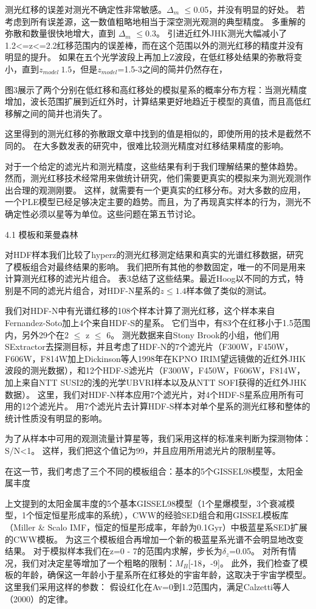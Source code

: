 \documentclass[8pt,a4paper,openany,twoside]{book}
\begin{document}
测光红移的误差对测光不确定性非常敏感。$\Delta_m$ $\leq$0.05，并没有明显的好处。
若考虑到所有误差源，这一数值粗略地相当于深空测光观测的典型精度。
多重解的弥散和数量很快地增大，直到 $\Delta_m$ $\leq$0.3。
引进近红外JHK测光大幅减小了1.2<=z<=2.2红移范围内的误差棒，而在这个范围以外的测光红移的精度并没有明显的提升。
如果在五个光学波段上再加上Z波段，在低红移处结果的弥散将变小，直到$z_{model}~1.5$，但是$z_{model}$=1.5-3之间的简并仍然存在，
 
图3展示了两个分别在低红移和高红移处的模拟星系的概率分布方程：当测光精度增加，波长范围扩展到近红外时，计算结果更好地趋近于模型的真值，而且高低红移解之间的简并也消失了。
 
这里得到的测光红移的弥散跟文章中找到的值是相似的，即使所用的技术是截然不同的。
在大多数发表的研究中，很难比较测光精度对红移结果精度的影响。
 
对于一个给定的滤光片和测光精度，这些结果有利于我们理解结果的整体趋势。
然而，测光红移技术经常用来做统计研究，他们需要更真实的模拟来为测光观测作出合理的观测刚要。
这样，就需要有一个更真实的红移分布。对大多数的应用，一个PLE模型已经足够决定主要的趋势。而且，为了再现真实样本的行为，测光不确定性必须以星等为单位。这些问题在第五节讨论。
 
4.1 模板和莱曼森林
 
对HDF样本我们比较了hyperz的测光红移测定结果和真实的光谱红移数据，研究了模板组合对最终结果的影响。
我们把所有其他的参数固定，唯一的不同是用来计算测光红移的滤光片组合。
表3总结了这些结果。最近Hoog以不同的方式，特别是不同的滤光片组合，对HDF-N星系的$z\leq1.4$样本做了类似的测试。
 
我们对HDF-N中有光谱红移的108个样本计算了测光红移，这个样本来自Fernandez-Soto加上4个来自HDF-S的星系。
它们当中，有83个在红移小于1.5范围内，另外29个在2 $\le$ z $\le$ 6。
测光数据来自Stony Brook的小组，他们用SExtractor去探测目标，并且考虑了HDF-N的7个滤光片（F300W，F450W，F606W，F814W加上Dickinson等人1998年在KPNO IRIM望远镜做的近红外JHK波段的测光数据），和12个HDF-S滤光片（F300W，F450W，F606W，F814W，加上来自NTT SUSI2的浅的光学UBVRI样本以及从NTT SOFI获得的近红外JHK数据）。
这里，我们对HDF-N样本应用7个滤光片，对4个HDF-S星系应用所有可用的12个滤光片。
用7个滤光片去计算HDF-S样本对单个星系的测光红移和整体的统计性质没有明显的影响。
 
为了从样本中可用的观测流量计算星等，我们采用这样的标准来判断为探测物体：S/N<1。
这样，我们把这个值记为99，并且应用所用滤光片的限制星等。
 
在这一节，我们考虑了三个不同的模板组合：基本的5个GISSEL98模型，太阳金属丰度
 
上文提到的太阳金属丰度的5个基本GISSEL98模型（1个星爆模型，3个衰减模型，1个恒定恒星形成率的系统），CWW的经验SED组合和用GISSEL模板库（Miller \& Scalo IMF，恒定的恒星形成率，年龄为0.1Gyr）中极蓝星系SED扩展的CWW模板。
为这三个模板组合再增加一个新的极蓝星系光谱不会明显地改变结果。
对于模拟样本我们在z=0 - 7的范围内求解，步长为$\delta_z$=0.05。
对所有情况，我们对决定星等增加了一个粗略的限制：$M_B$[-18，-9]。
此外，我们检查了模板的年龄，确保这一年龄小于星系所在红移处的宇宙年龄，这取决于宇宙学模型。
这里我们采用这样的参数：
假设红化在Av=0到1.2范围内，满足Calzetti等人（2000）的定律。
 
\end{document}
